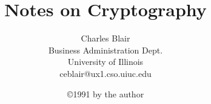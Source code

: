 %
%
%
%
%
%
%
\title{Notes on Cryptography }\author{Charles Blair\\
Business Administration Dept.\\University of Illinois\\
ceblair@ux1.cso.uiuc.edu}
\date{\copyright1991 by the author}\maketitle\tableofcontents
\newtheorem{Th}{Theorem}
\newtheorem{Le}[Th]{Lemma}\newtheorem{Co}[Th]{Corollary}
\newcommand{\pq}{\par\medskip}
\newcommand{\co}[3]{#1\equiv#2\hbox{ mod }#3}
\newcommand{\ro}{\hbox{ or }}
\newcommand{\zo}{Z^1_n}\newcommand{\ps}{p_{PS}}
\newcommand{\T}{{\bf T}} \newcommand{\F}{{\bf F}}
\newenvironment{lst}
{\begin{center}\begin{tabular}{l}}{\end{tabular}\end{center}}
